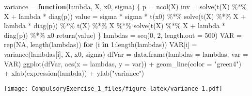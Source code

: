 \documentclass[
]{article}
\newenvironment{Shaded}{\begin{snugshade}}{\end{snugshade}}
\newcommand{\AttributeTok}[1]{\textcolor[rgb]{0.77,0.63,0.00}{#1}}
\newcommand{\ConstantTok}[1]{\textcolor[rgb]{0.00,0.00,0.00}{#1}}
\newcommand{\ControlFlowTok}[1]{\textcolor[rgb]{0.13,0.29,0.53}{\textbf{#1}}}
\newcommand{\DecValTok}[1]{\textcolor[rgb]{0.00,0.00,0.81}{#1}}
\newcommand{\FunctionTok}[1]{\textcolor[rgb]{0.00,0.00,0.00}{#1}}
\newcommand{\NormalTok}[1]{#1}
\newcommand{\OtherTok}[1]{\textcolor[rgb]{0.56,0.35,0.01}{#1}}
\newcommand{\SpecialCharTok}[1]{\textcolor[rgb]{0.00,0.00,0.00}{#1}}
\newcommand{\StringTok}[1]{\textcolor[rgb]{0.31,0.60,0.02}{#1}}
\begin{document}
\begin{Shaded}
\begin{Highlighting}[]
\NormalTok{variance }\OtherTok{=} \ControlFlowTok{function}\NormalTok{(lambda, X, x0, sigma) \{}
\NormalTok{  p }\OtherTok{=} \FunctionTok{ncol}\NormalTok{(X)}
\NormalTok{  inv }\OtherTok{=} \FunctionTok{solve}\NormalTok{(}\FunctionTok{t}\NormalTok{(X) }\SpecialCharTok{\%*\%}\NormalTok{ X }\SpecialCharTok{+}\NormalTok{ lambda }\SpecialCharTok{*} \FunctionTok{diag}\NormalTok{(p))}
\NormalTok{  value }\OtherTok{=}\NormalTok{ sigma }\SpecialCharTok{*}\NormalTok{ sigma }\SpecialCharTok{*} \FunctionTok{t}\NormalTok{(x0) }\SpecialCharTok{\%*\%} \FunctionTok{solve}\NormalTok{(}\FunctionTok{t}\NormalTok{(X) }\SpecialCharTok{\%*\%}\NormalTok{ X }\SpecialCharTok{+}\NormalTok{ lambda }\SpecialCharTok{*} \FunctionTok{diag}\NormalTok{(p)) }\SpecialCharTok{\%*\%} \FunctionTok{t}\NormalTok{(X) }\SpecialCharTok{\%*\%}\NormalTok{ X }\SpecialCharTok{\%*\%} \FunctionTok{solve}\NormalTok{(}\FunctionTok{t}\NormalTok{(X) }\SpecialCharTok{\%*\%}\NormalTok{ X }\SpecialCharTok{+}\NormalTok{ lambda }\SpecialCharTok{*} \FunctionTok{diag}\NormalTok{(p)) }\SpecialCharTok{\%*\%}\NormalTok{ x0}
  \FunctionTok{return}\NormalTok{(value)}
\NormalTok{\}}
\NormalTok{lambdas }\OtherTok{=} \FunctionTok{seq}\NormalTok{(}\DecValTok{0}\NormalTok{, }\DecValTok{2}\NormalTok{, }\AttributeTok{length.out =} \DecValTok{500}\NormalTok{)}
\NormalTok{VAR }\OtherTok{=} \FunctionTok{rep}\NormalTok{(}\ConstantTok{NA}\NormalTok{, }\FunctionTok{length}\NormalTok{(lambdas))}
\ControlFlowTok{for}\NormalTok{ (i }\ControlFlowTok{in} \DecValTok{1}\SpecialCharTok{:}\FunctionTok{length}\NormalTok{(lambdas)) VAR[i] }\OtherTok{=} \FunctionTok{variance}\NormalTok{(lambdas[i], X, x0, sigma)}
\NormalTok{dfVar }\OtherTok{=} \FunctionTok{data.frame}\NormalTok{(}\AttributeTok{lambdas =}\NormalTok{ lambdas, }\AttributeTok{var =}\NormalTok{ VAR)}
\FunctionTok{ggplot}\NormalTok{(dfVar, }\FunctionTok{aes}\NormalTok{(}\AttributeTok{x =}\NormalTok{ lambdas, }\AttributeTok{y =}\NormalTok{ var)) }\SpecialCharTok{+} \FunctionTok{geom\_line}\NormalTok{(}\AttributeTok{color =} \StringTok{"green4"}\NormalTok{) }\SpecialCharTok{+} \FunctionTok{xlab}\NormalTok{(}\FunctionTok{expression}\NormalTok{(lambda)) }\SpecialCharTok{+}
  \FunctionTok{ylab}\NormalTok{(}\StringTok{"variance"}\NormalTok{)}
\end{Highlighting}
\end{Shaded}

\texttt{[image: CompulsoryExercise\_1\_files/figure-latex/variance-1.pdf]}
\end{document}
